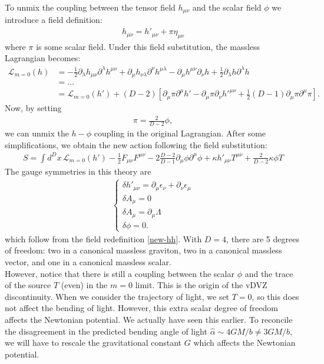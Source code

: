 \documentclass{book}
\theoremstyle{definition}
\newcommand{\p}{\partial}
\newcommand{\lag}{\mathcal{L}}
\newcommand{\nn}{\nonumber}
\newcommand{\f}[2]{\frac{#1}{#2}}
\newcommand{\lb}{\left[}
\newcommand{\rb}{\right]}
\begin{document}
To unmix the coupling between the tensor field $h_{\mu\nu}$ and the scalar field $\phi$ we introduce a field definition:
\begin{align}\label{new-hh}
\boxed{h_{\mu\nu} = h'_{\mu\nu} + \pi \eta_{\mu\nu}}
\end{align}
where $\pi$ is some scalar field. Under this field substitution, the massless Lagrangian becomes:
\begin{align}
\lag_{m=0}(h) &= -\f{1}{2}\p_\lambda h_{\mu\nu} \p^\lambda h^{\mu\nu} + \p_\mu h_{\nu\lambda}\p^\nu h^{\mu\lambda} - \p_\mu h^{\mu\nu}\p_\nu h + \f{1}{2}\p_\lambda h \p^\lambda h \nn\\
&= \dots\nn\\
&= \lag_{m=0}(h') + (D-2)\lb \p_\mu \pi \p^\mu h' - \p_\mu \pi \p_\nu h'^{\mu\nu} + \f{1}{2}(D-1)\p_\mu \pi \p^\mu \pi \rb.
\end{align}
Now, by setting
\begin{align}
\pi = \f{2}{D-2}\phi,
\end{align}
we can unmix the $h-\phi$ coupling in the original Lagrangian. After some simplifications, we obtain the new action following the field substitution:
\begin{align}
\boxed{S = \int d^Dx\,\lag_{m=0}(h') - \f{1}{2}F_{\mu\nu}F^{\mu\nu} - 2\f{D-2}{D-1}\p_\mu \phi \p^\mu \phi + \kappa h'_{\mu\nu}T^{\mu\nu} + \f{2}{D-2}\kappa \phi T}
\end{align}
The gauge symmetries in this theory are
\begin{align}
\begin{cases}
\delta h'_{\mu\nu} = \p_\mu \epsilon_\nu + \p_\nu \epsilon_\mu \nn\\
\delta A_\mu = 0\nn\\
\delta A_\mu = \p_\mu \Lambda\nn\\
\delta \phi = 0.
\end{cases}
\end{align}
which follow from the field redefinition \eqref{new-hh}. With $D=4$, there are 5 degrees of freedom: two in a canonical massless graviton, two in a canonical massless vector, and one in a canonical massless scalar. \\

However, notice that there is still a coupling between the scalar $\phi$ and the trace of the source $T$ (even) in the $m=0$ limit. This is the origin of the vDVZ discontinuity. When we consider the trajectory of light, we set $T=0$, so this does not affect the bending of light. However, this extra scalar degree of freedom affects the Newtonian potential. We actually have seen this earlier. To reconcile the disagreement in the predicted bending angle of light $\hat{\alpha} \sim 4GM/b \neq 3GM/b$, we will have to rescale the gravitational constant $G$ which affects the Newtonian potential.\\
\end{document}
